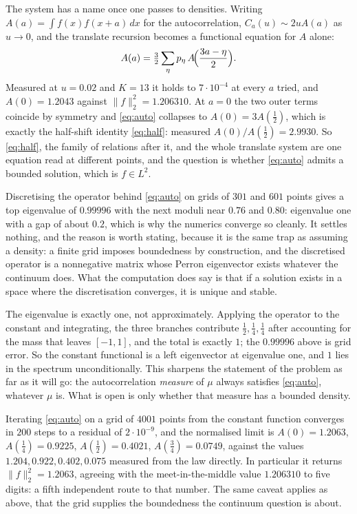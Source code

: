 \documentclass[11pt]{article}
\theoremstyle{remark}
\begin{document}
The system has a name once one passes to densities. Writing $A(a)=\int f(x)f(x+a)\,dx$ for the
autocorrelation, $C_a(u)\sim2uA(a)$ as $u\to0$, and the translate recursion becomes a functional equation
for $A$ alone:
\begin{equation}\label{eq:auto}
  A(a)=\tfrac32\sum_\eta p_\eta\,A\!\Bigl(\frac{3a-\eta}{2}\Bigr).
\end{equation}
Measured at $u=0.02$ and $K=13$ it holds to $7\cdot10^{-4}$ at every $a$ tried, and $A(0)=1.2043$ against
$\|f\|_2^2=1.206310$. At $a=0$ the two outer terms coincide by symmetry and \eqref{eq:auto} collapses to
$A(0)=3A(\tfrac12)$, which is exactly the half-shift identity \eqref{eq:half}: measured
$A(0)/A(\tfrac12)=2.9930$. So \eqref{eq:half}, the family of relations after it, and the whole translate
system are one equation read at different points, and the question is whether \eqref{eq:auto} admits a
bounded solution, which is $f\in L^2$.

Discretising the operator behind \eqref{eq:auto} on grids of $301$ and $601$ points gives a top eigenvalue
of $0.99996$ with the next moduli near $0.76$ and $0.80$: eigenvalue one with a gap of about $0.2$, which
is why the numerics converge so cleanly. It settles nothing, and the reason is worth stating, because it
is the same trap as assuming a density: a finite grid imposes boundedness by construction, and the
discretised operator is a nonnegative matrix whose Perron eigenvector exists whatever the continuum does.
What the computation does say is that if a solution exists in a space where the discretisation converges,
it is unique and stable.

The eigenvalue is exactly one, not approximately. Applying the operator to the constant and integrating,
the three branches contribute $\tfrac12,\tfrac14,\tfrac14$ after accounting for the mass that leaves
$[-1,1]$, and the total is exactly $1$; the $0.99996$ above is grid error. So the constant functional is a
left eigenvector at eigenvalue one, and $1$ lies in the spectrum unconditionally. This sharpens the
statement of the problem as far as it will go: the autocorrelation \emph{measure} of $\mu$ always
satisfies \eqref{eq:auto}, whatever $\mu$ is. What is open is only whether that measure has a bounded
density.

Iterating \eqref{eq:auto} on a grid of $4001$ points from the constant function converges in $200$ steps
to a residual of $2\cdot10^{-9}$, and the normalised limit is $A(0)=1.2063$, $A(\tfrac14)=0.9225$,
$A(\tfrac12)=0.4021$, $A(\tfrac34)=0.0749$, against the values $1.204,0.922,0.402,0.075$ measured from the
law directly. In particular it returns $\|f\|_2^2=1.2063$, agreeing with the meet-in-the-middle value
$1.206310$ to five digits: a fifth independent route to that number. The same caveat applies as above,
that the grid supplies the boundedness the continuum question is about.
\end{document}
